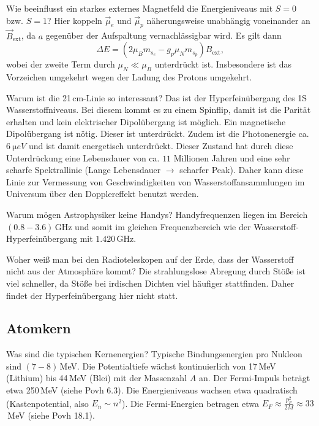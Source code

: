 \begin{fquestion}{Wie beeinflusst ein starkes externes Magnetfeld die Energieniveaus mit $S=0$ bzw. $S=1$?}
    Hier koppeln $\Vec{\mu}_e$ und $\Vec{\mu}_p$ näherungsweise unabhängig voneinander an $\Vec{B}_\mathrm{ext}$, da $a$ gegenüber der Aufspaltung vernachlässigbar wird.
    Es gilt dann 
    $$\Delta E = (2\mu_B m_{s_e} - g_p \mu_N m_{s_p}) B_\mathrm{ext},$$ 
    wobei der zweite Term durch $\mu_N \ll \mu_B$ unterdrückt ist.
    Insbesondere ist das Vorzeichen umgekehrt wegen der Ladung des Protons umgekehrt.
\end{fquestion}

\begin{fquestion}{Warum ist die 21\,cm-Linie so interessant?}
    Das ist der Hyperfeinübergang des 1S Wasserstoffniveaus. 
    Bei diesem kommt es zu einem Spinflip, damit ist die Parität erhalten und kein elektrischer Dipolübergang ist möglich. 
    Ein magnetische Dipolübergang ist nötig. 
    Dieser ist unterdrückt. 
    Zudem ist die Photonenergie ca. $\SI{6}{\micro eV}$ und ist damit energetisch unterdrückt. 
    Dieser Zustand hat durch diese Unterdrückung eine Lebensdauer von ca. $11$ Millionen Jahren und eine sehr scharfe Spektrallinie (Lange Lebensdauer $\rightarrow$ scharfer Peak). 
    Daher kann diese Linie zur Vermessung von Geschwindigkeiten von Wasserstoffansammlungen im Universum über den Dopplereffekt benutzt werden. 
\end{fquestion}

\begin{fquestion}{Warum mögen Astrophysiker keine Handys?}
    Handyfrequenzen liegen im Bereich $(0.8 -3.6)\,$GHz und somit im gleichen Frequenzbereich wie der Wasserstoff-Hyperfeinübergang mit $1.420\,$GHz. 
\end{fquestion}

\begin{fquestion}{Woher weiß man bei den Radioteleskopen auf der Erde, dass der Wasserstoff nicht aus der Atmosphäre kommt?}
    Die strahlungslose Abregung durch Stöße ist viel schneller, da Stöße bei irdischen Dichten viel häufiger stattfinden. 
    Daher findet der Hyperfeinübergang hier nicht statt. 
\end{fquestion}

\subsection{Atomkern}

\begin{fquestion}{Was sind die typischen Kernenergien?}
    Typische Bindungsenergien pro Nukleon sind $(7-8)$\,MeV.
    Die Potentialtiefe wächst kontinuierlich von 17\,MeV (Lithium) bis 44\,MeV (Blei) mit der Massenzahl $A$ an.
    Der Fermi-Impuls beträgt etwa 250\,MeV (siehe Povh 6.3).
    Die Energieniveaus wachsen etwa quadratisch (Kastenpotential, also $E_n\sim n^2$).
    Die Fermi-Energien betragen etwa $E_F \approx \frac{p_F^2}{2M} \approx 33$\,MeV (siehe Povh 18.1).
\end{fquestion}

